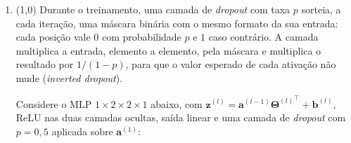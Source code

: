 \documentclass[11pt,a4paper]{article}
\begin{document}
\begin{enumerate}[1)]
\begin{minipage}[t]{0.47\linewidth}
\begin{enumerate}[a)]
    \item $2{,}24$; $2{,}24$; $4{,}04$
    \item $2{,}24$; $7{,}24$; $4{,}04$
    \item $2{,}24$; $2{,}24$; $2{,}24$
    \item $2{,}24$; $2{,}24$; $4{,}48$
\end{enumerate}
\end{minipage}\hfill
\begin{minipage}[t]{0.47\linewidth}
\begin{enumerate}[a)]
\setcounter{enumii}{4}
    \item $2{,}24$; $7{,}24$; $4{,}48$
    \item $2{,}24$; $7{,}24$; $2{,}24$
    \item $2{,}24$; $2{,}24$; $1{,}12$
    \item $2{,}24$; $7{,}24$; $1{,}12$
\end{enumerate}
\end{minipage}

\pagebreak
\item (1{,}0) Durante o treinamento, uma camada de \textit{dropout} com taxa $p$ sorteia, a cada iteração, uma máscara binária com o mesmo formato da sua entrada: cada posição vale $0$ com probabilidade $p$ e $1$ caso contrário. A camada multiplica a entrada, elemento a elemento, pela máscara e multiplica o resultado por $1/(1-p)$, para que o valor esperado de cada ativação não mude (\textit{inverted dropout}).

Considere o MLP $1 \times 2 \times 2 \times 1$ abaixo, com $\mathbf{z}^{(l)} = \mathbf{a}^{(l-1)}{\mathbf{\Theta}^{(l)}}^{\top} + \mathbf{b}^{(l)}$, ReLU nas duas camadas ocultas, saída linear e uma camada de \textit{dropout} com $p = 0{,}5$ aplicada sobre $\mathbf{a}^{(1)}$:


\end{enumerate}
\end{document}
